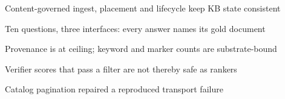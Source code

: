 \begin{highlights}
\item Content-governed ingest, placement and lifecycle keep KB state consistent
\item Ten questions, three interfaces: every answer names its gold document
\item Provenance is at ceiling; keyword and marker counts are substrate-bound
\item Verifier scores that pass a filter are not thereby safe as rankers
\item Catalog pagination repaired a reproduced transport failure
\end{highlights}
